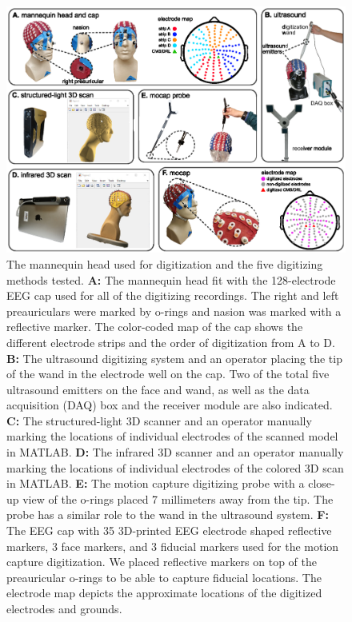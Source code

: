 \documentclass{UCF_ETD}
\renewcommand{\ul}{}
\begin{document}
\begin{figure}[h!]
    \centering
    \includegraphics{img/method1-r2.eps}
    \caption{The mannequin head used for digitization and the five digitizing methods tested. \textbf{A:} The mannequin head fit with the 128-electrode EEG cap used for all of the digitizing recordings. \ul{The right and left preauriculars were marked by o-rings and nasion was marked with a reflective marker}. The color-coded map of the cap shows the different electrode strips and the order of digitization from A to D. \textbf{B:} The ultrasound digitizing system and an operator placing the tip of the wand in the electrode well on the cap. \ul{Two of the total five ultrasound emitters on the face and wand, as well as the data acquisition (DAQ) box and the receiver module are also indicated.} \textbf{C:} The structured-light 3D scanner and an operator manually marking the locations of individual electrodes of the scanned model in MATLAB. \textbf{D:} The infrared 3D scanner and an operator manually marking the locations of individual electrodes of the colored 3D scan in MATLAB. \textbf{E:} The motion capture digitizing probe with a close-up view of the o-rings placed 7 millimeters away from the tip. The probe \ul{has a similar role} to the wand in the ultrasound system. \textbf{F:} The EEG cap with 35 3D-printed EEG electrode shaped reflective markers, 3 face markers, and 3 fiducial markers used for the motion capture digitization. \ul{We placed reflective markers on top of the preauricular o-rings to be able to capture fiducial locations.} The electrode map depicts the approximate locations of the digitized electrodes and grounds.}
    \label{fig:m1}
\end{figure}
\end{document}
